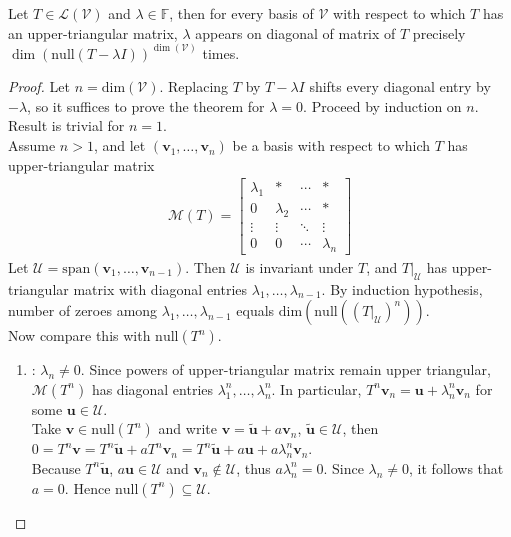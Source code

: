 \begin{theorem} \label{thm:eigenvaluerepeatisindepbasis} Let $T \in \mathcal{L}(\mathcal{V})$ and $\lambda \in \mathbb{F}$, then for every basis of $\mathcal{V}$ with respect to which $T$ has an upper-triangular matrix, $\lambda$ appears on diagonal of matrix of $T$ precisely $\dim(\text{null}(T - \lambda I))^{\dim(\mathcal{V})}$ times.
\begin{proof} Let $n = \text{dim}(\mathcal{V})$. Replacing $T$ by $T - \lambda I$ shifts every diagonal entry by $-\lambda$, so it suffices to prove the theorem for $\lambda = 0$. Proceed by induction on $n$. Result is trivial for $n=1$.\\
Assume $n>1$, and let $(\mathbf{v}_1, \ldots, \mathbf{v}_n)$ be a basis with respect to which $T$ has upper-triangular matrix
\begin{align}
\mathcal{M}(T) =
\begin{bmatrix}
\lambda_1 & * & \cdots & * \\
0 & \lambda_2 & \cdots & * \\
\vdots & \vdots & \ddots & \vdots \\
0 & 0 & \cdots & \lambda_n
\end{bmatrix} \nonumber
\end{align}
Let $\mathcal{U} = \text{span}(\mathbf{v}_1, \ldots, \mathbf{v}_{n-1})$. Then $\mathcal{U}$ is invariant under $T$, and $T|_{\mathcal{U}}$ has upper-triangular matrix with diagonal entries $\lambda_1, \ldots, \lambda_{n-1}$. By induction hypothesis, number of zeroes among $\lambda_1, \ldots, \lambda_{n-1}$ equals $\text{dim}(\text{null}((T|_{\mathcal{U}})^n))$.\\
Now compare this with $\text{null}(T^n)$.
\begin{enumerate}[label=\roman*.]
\setlength{\itemsep}{0pt}
\item[Case $1$]: $\lambda_n \neq 0$. Since powers of upper-triangular matrix remain upper triangular, $\mathcal{M}(T^n)$ has diagonal entries $\lambda_1^n, \ldots, \lambda_n^n$. In particular, $T^n \mathbf{v}_n = \mathbf{u} + \lambda_n^n \mathbf{v}_n$ for some $\mathbf{u} \in \mathcal{U}$.\\
Take $\mathbf{v} \in \text{null}(T^n)$ and write $\mathbf{v} = \tilde{\mathbf{u}} + a \mathbf{v}_n$, $\tilde{\mathbf{u}} \in \mathcal{U}$, then $0 = T^n \mathbf{v} = T^n \tilde{\mathbf{u}} + a T^n \mathbf{v}_n = T^n \tilde{\mathbf{u}} + a \mathbf{u} + a \lambda_n^n \mathbf{v}_n$.\\
Because $T^n \tilde{\mathbf{u}}$, $a \mathbf{u} \in \mathcal{U}$ and $\mathbf{v}_n \notin \mathcal{U}$, thus $a \lambda_n^n = 0$. Since $\lambda_n \neq 0$, it follows that $a=0$. Hence $\text{null}(T^n) \subseteq \mathcal{U}$.\\

\end{enumerate}
\end{proof}
\end{theorem}
